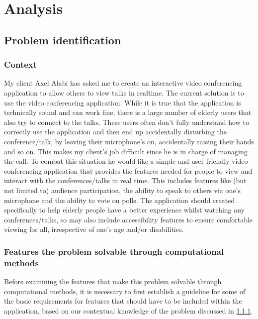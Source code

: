 \pagestyle{fancy}
\chead{\thepage}

\chapter{Analysis}

\section{Problem identification}

\subsection{Context}
\label{sec:1.1.1}

My client Axel Alabi has asked me to create an interactive
video conferencing application to allow others to view talks 
in realtime. The current solution is to use the  
video conferencing application. While it is true that the 
application is technically sound and can work fine, there is a
large number of elderly users that also try to connect to the 
talks. These users often don't fully understand how to 
correctly use the application and then end up accidentally 
disturbing the conference/talk, by leaving their microphone's
on, accidentally raising their hands and so on. This makes my
client's job difficult since he is in charge of managing the 
 call. To combat this situation he would like a 
simple and user friendly video conferencing application that
provides the features needed for people to view and interact
with the conferences/talks in real time. This includes 
features like (but not limited to) audience participation,
the ability to speak to others via one's microphone and the
ability to vote on polls. The application should
created specifically to help elderly people have a better 
experience whilst watching any conferences/talks, so may also
include accessibility features to ensure comfortable viewing
for all, irrespective of one's age and/or disabilities.

\subsection{Features the problem solvable through
computational methods}

Before examining the features that make this problem solvable
through computational methods, it is necessary to first 
establish a guideline for some of the basic requirements
for features that should have to be included within the 
application, based on our contextual knowledge of the problem
discussed in 
\ref{sec:1.1.1}. \vspace{0.2cm}


